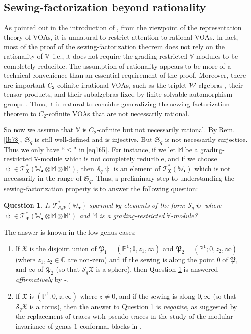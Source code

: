 \documentclass[11pt,b5paper,notitlepage]{article}
\theoremstyle{definition}
\theoremstyle{plain}
\newtheorem{que}[df]{Question}
\newcommand{\fk}{\mathfrak}
\newcommand{\mc}{\mathcal}
\newcommand{\scr}{\mathscr}
\newcommand{\blt}{\bullet}
\newcommand{\Vbb}{\mathbb V}
\newcommand{\Wbb}{\mathbb W}
\newcommand{\Mbb}{\mathbb M}
\newcommand{\Cbb}{\mathbb C}
\newcommand{\Pbb}{\mathbb P}
\newcommand{\<}{\left\langle}
\renewcommand{\>}{\right\rangle}
\newcommand{\fx}{\mathfrak{X}}
\numberwithin{equation}{subsection}
\begin{document}
\subsection{Sewing-factorization beyond rationality}


As pointed out in the introduction of \cite{HLZ1}, from the viewpoint of the representation theory of VOAs, it is unnatural to restrict attention to rational VOAs. In fact, most of the proof of the sewing-factorization theorem does not rely on the rationality of $\Vbb$, i.e., it does not require the grading-restricted $\Vbb$-modules to be completely reducible. The assumption of rationality appears to be more of a technical convenience than an essential requirement of the proof. Moreover, there are important $C_2$-cofinite irrational VOAs, such as the triplet $\mc W$-algebras \cite{AM-triplet}, their tensor products, and their subalgebras fixed by finite solvable automorphism groups \cite{Miy-C2-orbifold}. Thus, it is natural to consider generalizing the sewing-factorization theorem to $C_2$-cofinite VOAs that are not necessarily rational.


So now we assume that $\Vbb$ is $C_2$-cofinite but not necessarily rational. By Rem. \ref{lb78}, $\fk S_q$ is still well-defined and is injective. But $\fk S_q$ is not necessarily surjectice. Thus we only have ``$\leq$" in \eqref{eq165}. For instance, if we let $\Mbb$ be a grading-restricted $\Vbb$-module which is not completely reducible, and if we choose $\uppsi\in\scr T_{\fx}^*(\Wbb_\blt\otimes\Mbb\otimes \Mbb')$, then $\mc S_q\uppsi$ is an element of $\scr T_{\fx}^*(\Wbb_\blt)$ which is not necessarily in the range of $\fk S_q$. Thus, a preliminary step to understanding the sewing-factorization property is to answer the following question: 

\begin{que}\label{lb79}
Is $\scr T_{\mc S_q\fx}^*(\Wbb_\blt)$ spanned by elements of the form $\mc S_q\uppsi$ where $\uppsi\in\scr T_{\fx}^*(\Wbb_\blt\otimes\Mbb\otimes \Mbb')$ and $\Mbb$ is a grading-restricted $\Vbb$-module?
\end{que}


The answer is known in the low genus cases:
\begin{enumerate}[align=left, label=Case \arabic*.]
\item If $\fx$ is the disjoint union of $\fk P_1=(\Pbb^1;0,z_1,\infty)$ and $\fk P_2=(\Pbb^1;0,z_2,\infty)$ (where $z_1,z_2\in\Cbb$ are non-zero) and if the sewing is along the point $0$ of $\fk P_1$ and $\infty$ of $\fk P_2$ (so that $\mc S_q\fk X$ is a sphere), then Question \ref{lb79} is answered \emph{affirmatively} by \cite{HLZ1,HLZ2}-\cite{HLZ8}.
\item If $\fk X$ is $(\Pbb^1;0,z,\infty)$ where $z\neq 0$, and if the sewing is along $0,\infty$ (so that $\mc S_q\fx$ is a torus), then the answer to Question \ref{lb79} is \emph{negative}, as suggested by the replacement of traces with pseudo-traces in the study of the modular invariance of genus $1$ conformal blocks in \cite{Miy-modular-invariance,AN-pseudo-trace}.
\end{enumerate}
\end{document}
